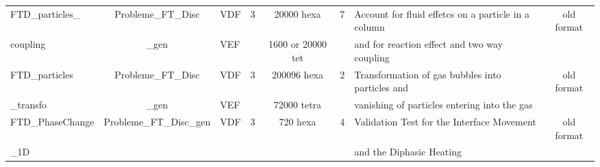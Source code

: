\begin{table}[H]
\begin{centering}
\begin{tabular}{lclccclc}
\hline
\rowcolor{Orchid!10}FTD\_particles\_ & Probleme\_FT\_Disc & VDF & 3 & 20000 hexa & 7 & Account for fluid effetcs on a particle in a column  & old format \\ 
\rowcolor{Orchid!10}coupling & \_gen & VEF & & 1600 or 20000 tet & & and for reaction effect and two way coupling & \\
\hline
\rowcolor{Orchid!10}FTD\_particles & Probleme\_FT\_Disc & VDF & 3 & 200096 hexa & 2 & Transformation of gas bubbles into particles and & old format \\ 
\rowcolor{Orchid!10}\_transfo & \_gen & VEF &  & 72000 tetra & & vanishing of particles entering into the gas & \\
\hline
\rowcolor{Orchid!10}FTD\_PhaseChange & Probleme\_FT\_Disc\_gen & VDF & 3 & 720 hexa & 4 & Validation Test for the Interface Movement & old format \\
\rowcolor{Orchid!10}\_1D & & & & & & and the Diphasic Heating & \\
\hline
\end{tabular}
\end{centering}
\end{table}

\newpage

